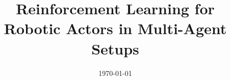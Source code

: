 \documentclass[a4paper, 11pt, oneside]{Thesis} %
\begin{document}
\frontmatter  %

\title {Reinforcement Learning for Robotic Actors in Multi-Agent Setups}
\addresses {\groupname\\\deptname\\\univname} %
\date  {\today}
\subject {}
\keywords {}

\maketitle


\fancyhead{} %
\rhead{\thepage} %
\lhead{} %

\pagestyle{fancy} %






\end{document}
